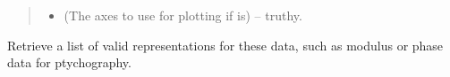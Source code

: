 \documentclass[letterpaper,10pt,english]{sphinxmanual}
\begin{document}
\begin{fulllineitems}
\begin{fulllineitems}
\begin{quote}
\begin{description}
\begin{itemize}
\item {} 
 (The axes to use for plotting if  is) -- truthy.

\end{itemize}

\end{description}\end{quote}

\end{fulllineitems}


\begin{fulllineitems}
\label{\detokenize{xanespy:xanespy.xanes_frameset.PtychoFrameset.representations}}
Retrieve a list of valid representations for these data, such as
modulus or phase data for ptychography.

\end{fulllineitems}


\end{fulllineitems}

\end{document}
